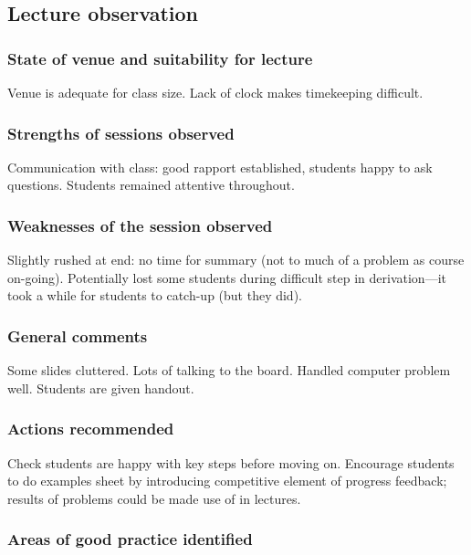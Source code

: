 \subsection{Lecture observation}\label{sec:other-lecture}

\subsubsection{State of venue and suitability for lecture}

Venue is adequate for class size. Lack of clock makes timekeeping difficult.

\subsubsection{Strengths of sessions observed}

Communication with class: good rapport established, students happy to ask questions. Students remained attentive throughout.

\subsubsection{Weaknesses of the session observed}

Slightly rushed at end: no time for summary (not to much of a problem as course on-going). Potentially lost some students during difficult step in derivation---it took a while for students to catch-up (but they did).

\subsubsection{General comments}

Some slides cluttered. Lots of talking to the board. Handled computer problem well. Students are given handout.

\subsubsection{Actions recommended}\label{sec:other-lecture-actions}

Check students are happy with key steps before moving on. Encourage students to do examples sheet by introducing competitive element of progress feedback; results of problems could be made use of in lectures.

\subsubsection{Areas of good practice identified}\label{sec:other-lecture-practice}

